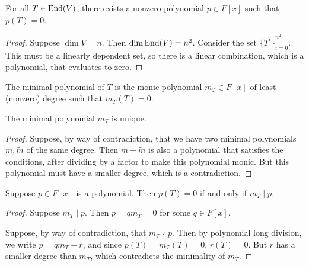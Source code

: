 \begin{lemma}
    For all \(T \in \operatorname{End}(V)\),
    there exists a nonzero polynomial \(p \in F[x]\) such that \(p(T) = 0\).
\end{lemma}
\begin{proof}
    Suppose \(\dim V = n\). Then \(\dim \operatorname{End}(V) = n^2\).
    Consider the set \({\{T^i\}}_{i=0}^{n^2}\).
    This must be a linearly dependent set,
    so there is a linear combination, which is a polynomial, that evaluates to zero.
\end{proof}
\begin{definition}
    The minimal polynomial of \(T\) is the monic polynomial \(m_T \in F[x]\)
    of least (nonzero) degree such that \(m_T(T) = 0\).
\end{definition}
\begin{proposition}
    The minimal polynomial \(m_T\) is unique.
\end{proposition}
\begin{proof}
    Suppose, by way of contradiction, that we have two minimal polynomials
    \(m,\tilde{m}\) of the same degree.
    Then \(m-\tilde{m}\) is also a polynomial that satisfies the conditions,
    after dividing by a factor to make this polynomial monic.
    But this polynomial must have a smaller degree, which is a contradiction.
\end{proof}
\begin{proposition}\label{prop:minimal-polynomial-factor}
    Suppose \(p \in F[x]\) is a polynomial.
    Then \(p(T) = 0\) if and only if \(m_T \mid p\).
\end{proposition}
\begin{proof}
    Suppose \(m_T \mid p\).
    Then \(p = q m_T = 0\) for some \(q \in F[x]\).

    Suppose, by way of contradiction, that \(m_T \nmid p\).
    Then by polynomial long division, we write \(p = q m_T + r\),
    and since \(p(T) = m_T(T) = 0\), \(r(T) = 0\).
    But \(r\) has a smaller degree than \(m_T\),
    which contradicts the minimality of \(m_T\).
\end{proof}

